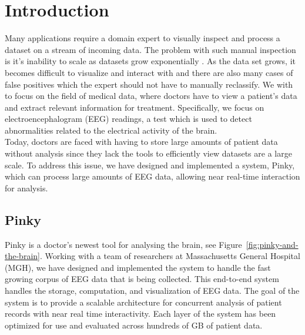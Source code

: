 \chapter{Introduction}\label{intro-ch}

Many applications require a domain expert to visually inspect and process a
dataset on a stream of incoming data. The problem with such manual inspection
is it's inability to scale as datasets grow exponentially \cite{exp-growth}. As
the data set grows, it becomes difficult to visualize and interact with
\cite{immens} and there are also many cases of false positives which the expert
should not have to manually reclassify. We with to focus on the field of
medical data, where doctors have to view a patient's data and extract relevant
information for treatment. Specifically, we focus on electroencephalogram (EEG)
readings, a test which is used to detect abnormalities related to the
electrical activity of the brain. \\

Today, doctors are faced with having to store large amounts of patient data
without analysis since they lack the tools to efficiently view datasets are a
large scale. To address this issue, we have designed and implemented a system,
Pinky, which can process large amounts of EEG data, allowing near real-time
interaction for analysis.


\section{Pinky}

Pinky is a doctor's newest tool for analysing the brain, see
Figure~\ref{fig:pinky-and-the-brain}. Working with a team of researchers at
Massachusetts General Hospital (MGH), we have designed and implemented the
system to handle the fast growing corpus of EEG data that is being collected.
This end-to-end system handles the storage, computation, and visualization of
EEG data.  The goal of the system is to provide a scalable architecture for
concurrent analysis of patient records with near real time interactivity. Each
layer of the system has been optimized for use and evaluated across hundreds of
GB of patient data. \\

